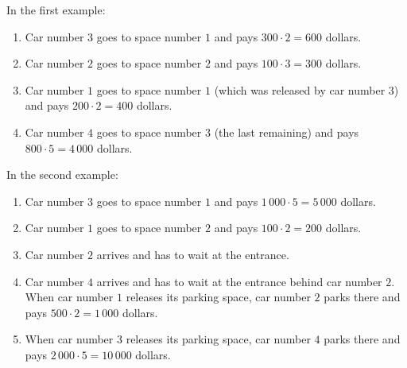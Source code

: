 In the first example:
\begin{enumerate}
\item Car number $3$ goes to space number $1$ and pays $300 \cdot 2 = 600$ dollars.
\item Car number $2$ goes to space number $2$ and pays $100 \cdot 3 = 300$ dollars.
\item Car number $1$ goes to space number $1$ (which was released by car number 3) and pays $200 \cdot 2 = 400$ dollars.
\item Car number $4$ goes to space number $3$ (the last remaining) and pays $800 \cdot 5 = 4\,000$ dollars. 
\end{enumerate}

In the second example:

\begin{enumerate}
\item Car number $3$ goes to space number $1$ and pays $1\,000 \cdot 5 = 5\,000$ dollars.
\item Car number $1$ goes to space number $2$ and pays $100 \cdot 2 = 200$ dollars.
\item Car number $2$ arrives and has to wait at the entrance.
\item Car number $4$ arrives and has to wait at the entrance behind car number $2$. When car number $1$ releases its parking space, car number $2$ parks there and pays $500 \cdot 2 = 1\,000$ dollars.
\item 
When car number $3$ releases its parking space, car number $4$ parks there and pays $2\,000 \cdot 5 = 10\,000$ dollars. 
\end{enumerate}
